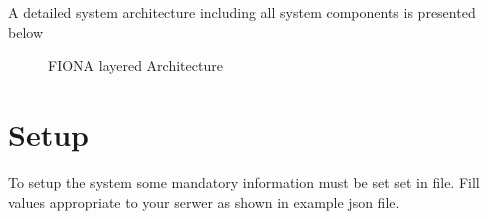 \documentclass[letterpaper,10pt,english]{sphinxmanual}
\begin{document}
\sphinxAtStartPar
{}

\sphinxAtStartPar
A detailed system architecture including all system components is presented below

\begin{figure}[htbp]
\centering
\capstart

\caption{FIONA layered Architecture}\label{\detokenize{Architecture/index:id1}}\end{figure}

\sphinxAtStartPar
{}


\section{Setup}
\label{\detokenize{Architecture/index:setup}}
\sphinxAtStartPar
To setup the system some mandatory information must be set set in  file. Fill values appropriate to your serwer as shown in example json file.
\def\sphinxLiteralBlockLabel{\label{\detokenize{Architecture/index:config-json}}}
%
\end{document}
